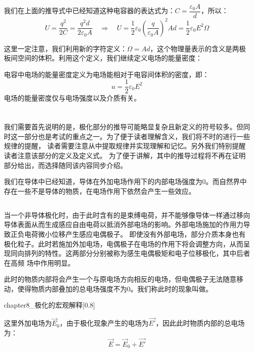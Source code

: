 我们在上面的推导式中已经知道这种电容器的表达式为：$C=\dfrac{\varepsilon_0 A}{d}$，所以：
\[U=\dfrac{q^2}{2C}=\dfrac{q^2 d}{2\varepsilon_0 A}\quad\Rightarrow\quad U=\dfrac{1}{2}\varepsilon_0 (\dfrac{q}{\varepsilon_0 A})^2 Ad=\dfrac{1}{2}\varepsilon_0 E^2\Omega\]

这里一定注意，我们利用新的字符定义：$\Omega =Ad$，这个物理量表示的含义是两极板间空间的体积。利用这个定义，我们继续定义电场的能量密度：
\begin{law}[电容中电场的能量密度]
    电容中电场的能量密度定义为电场能相对于电容间体积的密度，即：
    \[u=\dfrac{1}{2}\varepsilon_0 E^2\]
    电场的能量密度仅与电场强度以及介质有关。
\end{law}
\section[电介质的极化]{}
我们需要首先说明的是，极化部分的推导可能略显复杂且新定义的符号较多。但同时这一部分也是考试的重点之一。为了便于读者理解含义，我们将不时的进行一些规律的提醒，
读者需要注意从中提取规律并实现理解和记忆。另外我们特别提醒读者注意该部分的定义及定义式。
为了便于讲解，其中的推导过程将不再在证明部分给出，而选择随同该内容同步介绍。

我们在导体中已经知道，导体在外加电场作用下的内部电场强度为0。而自然界中存在一些不是导体的物质，在电场作用下依然会产生一些效应。
\subsection[极化的定义]{}
当一个非导体极化时，由于此时含有的是束缚电荷，并不能够像导体一样通过移向导体表面从而生成感应自由电荷以抵消外部电场的影响。外部电场施加的作用力导致正负电荷微小位移产生感应电偶极子。
即使没有外部电场，部分介质本身也有极化粒子。此时若施加外加电场，电偶极子在电场的作用下将会调整方向，从而呈现同向排列的特性。这两部分分别被称为感生电偶极矩和电子位移极化，其中后者在高频
场中作用明显。

此时的物质内部将会产生一个与原电场方向相反的电场，但电偶极子无法随意移动，使得物质内部叠加的总电场强度不为0。我们称此时的现象叫做。
\begin{singlefigure}[极化的宏观效应]{chapter8_极化的宏观解释}[0.8]
\end{singlefigure}

这里外加电场为$\vec{E}_0$，由于极化现象产生的电场为$\vec{E'}$，因此此时物质内部的总电场为：
\[\vec{E}=\vec{E}_0 + \vec{E'}\]

